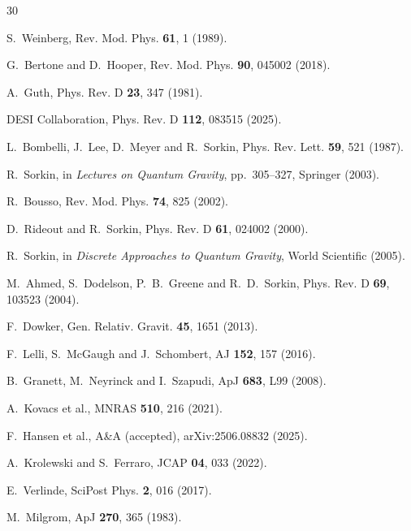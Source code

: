 \documentclass[12pt]{article}
\begin{document}
\begin{thebibliography}{30}

 S.~Weinberg, Rev. Mod. Phys. {\bf 61}, 1 (1989).

 G.~Bertone and D.~Hooper, Rev. Mod. Phys. {\bf 90}, 045002 (2018).

 A.~Guth, Phys. Rev. D {\bf 23}, 347 (1981).

 DESI Collaboration, Phys. Rev. D {\bf 112}, 083515 (2025).

 L.~Bombelli, J.~Lee, D.~Meyer and R.~Sorkin, Phys. Rev. Lett. {\bf 59}, 521 (1987).

 R.~Sorkin, in {\it Lectures on Quantum Gravity}, pp.~305--327, Springer (2003).

 R.~Bousso, Rev. Mod. Phys. {\bf 74}, 825 (2002).

 D.~Rideout and R.~Sorkin, Phys. Rev. D {\bf 61}, 024002 (2000).

 R.~Sorkin, in {\it Discrete Approaches to Quantum Gravity}, World Scientific (2005).

 M.~Ahmed, S.~Dodelson, P.~B.~Greene and R.~D.~Sorkin, Phys. Rev. D {\bf 69}, 103523 (2004).

 F.~Dowker, Gen. Relativ. Gravit. {\bf 45}, 1651 (2013).

 F.~Lelli, S.~McGaugh and J.~Schombert, AJ {\bf 152}, 157 (2016).

 B.~Granett, M.~Neyrinck and I.~Szapudi, ApJ {\bf 683}, L99 (2008).

 A.~Kovacs et al., MNRAS {\bf 510}, 216 (2021).

 F.~Hansen et al., A\&A (accepted), arXiv:2506.08832 (2025).

 A.~Krolewski and S.~Ferraro, JCAP {\bf 04}, 033 (2022).

 E.~Verlinde, SciPost Phys. {\bf 2}, 016 (2017).

 M.~Milgrom, ApJ {\bf 270}, 365 (1983).


\end{thebibliography}
\end{document}
